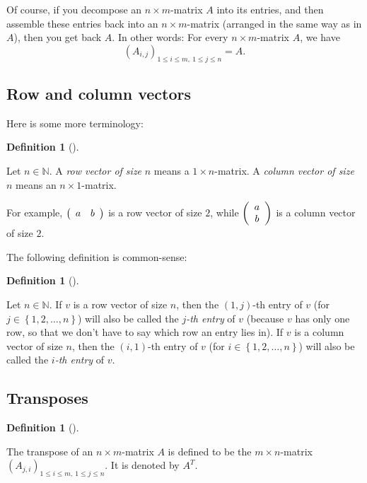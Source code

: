 \documentclass[numbers=enddot,12pt,final,onecolumn,notitlepage]{scrartcl}%
\theoremstyle{definition}
\newtheorem{defi}[theo]{Definition}
\newenvironment{definition}[1][]
{\begin{defi}[#1]\begin{leftbar}}
{\end{leftbar}\end{defi}}
\begin{document}
Of course, if you decompose an $n\times m$-matrix $A$ into its entries, and
then assemble these entries back into an $n\times m$-matrix (arranged in the
same way as in $A$), then you get back $A$. In other words: For every $n\times
m$-matrix $A$, we have%
\begin{equation}
\left(  A_{i,j}\right)  _{1\leq i\leq m,\ 1\leq j\leq n}=A.
\label{eq.matrix.A-through-Aij}%
\end{equation}


\subsection{Row and column vectors}

Here is some more terminology:

\begin{definition}
Let $n\in\mathbb{N}$. A \textit{row vector of size }$n$ means a $1\times
n$-matrix. A \textit{column vector of size }$n$ means an $n\times1$-matrix.
\end{definition}

For example, $\left(
\begin{array}
[c]{cc}%
a & b
\end{array}
\right)  $ is a row vector of size $2$, while $\left(
\begin{array}
[c]{c}%
a\\
b
\end{array}
\right)  $ is a column vector of size $2$.

The following definition is common-sense:

\begin{definition}
Let $n\in\mathbb{N}$. If $v$ is a row vector of size $n$, then the $\left(
1,j\right)  $-th entry of $v$ (for $j\in\left\{  1,2,\ldots,n\right\}  $) will
also be called the $j$\textit{-th entry} of $v$ (because $v$ has only one row,
so that we don't have to say which row an entry lies in). If $v$ is a column
vector of size $n$, then the $\left(  i,1\right)  $-th entry of $v$ (for
$i\in\left\{  1,2,\ldots,n\right\}  $) will also be called the $i$\textit{-th
entry} of $v$.
\end{definition}

\subsection{Transposes}

\begin{definition}
The transpose of an $n\times m$-matrix $A$ is defined to be the $m\times
n$-matrix $\left(  A_{j,i}\right)  _{1\leq i\leq m,\ 1\leq j\leq n}$. It is
denoted by $A^{T}$.
\end{definition}
\end{document}

